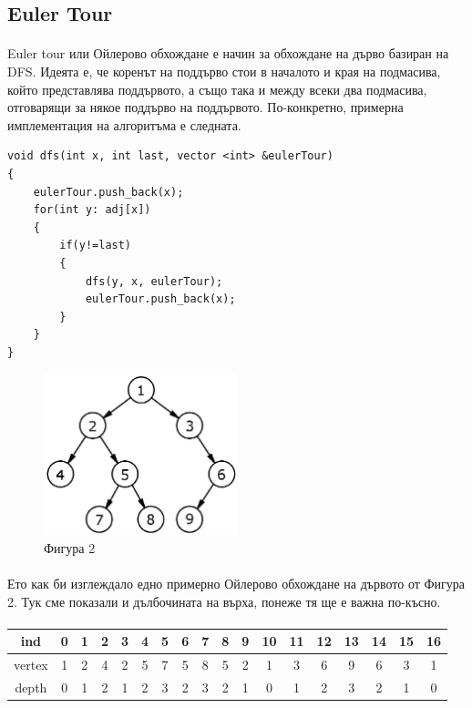 \documentclass[12pt]{article}
\begin{document}
\subsection*{Euler Tour}
\paragraph*{}
Euler tour или Ойлерово обхождане е начин за обхождане на дърво базиран на DFS. Идеята е, че коренът на поддърво стои в началото и края на подмасива, който представлява поддървото, а също така и между всеки два подмасива, отговарящи за някое поддърво на поддървото. По-конкретно, примерна имплементация на алгоритъма е следната.

\begin{lstlisting}
void dfs(int x, int last, vector <int> &eulerTour)
{
    eulerTour.push_back(x);
    for(int y: adj[x])
    {
        if(y!=last)
        {
            dfs(y, x, eulerTour);
            eulerTour.push_back(x);
        }
    }
}
\end{lstlisting}

\begin{figure}[h]
\caption*{Фигура 2}
\centering
\includegraphics[width=0.5\textwidth]{tree2}
\end{figure}

\paragraph*{}
Ето как би изглеждало едно примерно Ойлерово обхождане на дървото от Фигура 2. Тук сме показали и дълбочината на върха, понеже тя ще е важна по-късно.
\paragraph*{}
\begin{tabular}{ |c|c|c|c|c|c|c|c|c|c|c|c|c|c|c|c|c|c| } 
\hline
ind & 0 & 1 & 2 & 3 & 4 & 5 & 6 & 7 & 8 & 9 & 10 & 11 & 12 & 13 & 14 & 15 & 16 \\
\hline
vertex & 1 & 2 & 4 & 2 & 5 & 7 & 5 & 8 & 5 & 2 & 1 & 3 & 6 & 9 & 6 & 3 & 1 \\ 
\hline
depth & 0 & 1 & 2 & 1 & 2 & 3 & 2 & 3 & 2 & 1 & 0 & 1 & 2 & 3 & 2 & 1 & 0 \\
\hline
\end{tabular}
\end{document}
